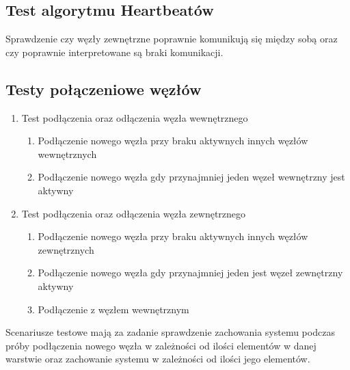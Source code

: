 \subsection[Test algorytmu Heartbeatów]{Test algorytmu Heartbeatów}
Sprawdzenie czy węzły zewnętrzne poprawnie komunikują się między sobą oraz czy poprawnie interpretowane są braki komunikacji.

\subsection[Testy połączeniowe węzłów]{Testy połączeniowe węzłów}
\begin{enumerate}
\item Test podłączenia oraz odłączenia węzła wewnętrznego
\begin{enumerate}
\item Podłączenie nowego węzła przy braku aktywnych innych węzłów wewnętrznych
\item Podłączenie nowego węzła gdy przynajmniej jeden węzeł wewnętrzny jest aktywny 
\end{enumerate}

\item Test podłączenia oraz odłączenia węzła zewnętrznego
\begin{enumerate}
\item Podłączenie nowego węzła przy braku aktywnych innych węzłów zewnętrznych
\item Podłączenie nowego węzła gdy przynajmniej jeden jest węzeł zewnętrzny aktywny
\item Podłączenie z węzłem wewnętrznym

\end{enumerate}
\end{enumerate}

Scenariusze testowe mają za zadanie sprawdzenie zachowania systemu podczas próby podłączenia nowego węzła w zależności od ilości elementów w danej warstwie oraz zachowanie systemu w zależności od ilości jego elementów.
